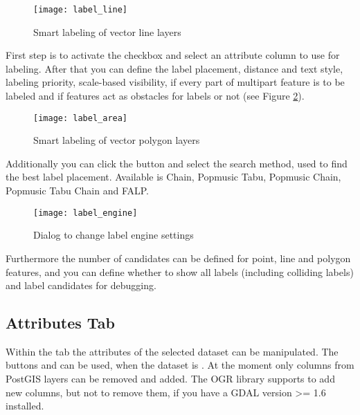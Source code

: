 \begin{figure}[ht]
\centering
   \texttt{[image: label\_line]}
   \caption{Smart labeling of vector line layers \nixcaption}\label{fig:linelabel}
\end{figure}


First step is to activate the  checkbox and select an attribute
column to use for labeling. After that you can define the label placement, distance and text
style, labeling priority, scale-based visibility, if every part of multipart feature is to be
labeled and if features act as obstacles for labels or not (see Figure \ref{fig:arealabel}).

\begin{figure}[ht]
\centering
   \texttt{[image: label\_area]}
   \caption{Smart labeling of vector polygon layers \nixcaption}\label{fig:arealabel}
\end{figure}


Additionally you can click the  button and select the search method,
used to find the best label placement. Available is Chain, Popmusic Tabu, Popmusic Chain,
Popmusic Tabu Chain and FALP.

\begin{figure}[ht]
\centering
   \texttt{[image: label\_engine]}
   \caption{Dialog to change label engine settings \nixcaption}\label{fig:labelengine}
\end{figure}

Furthermore the number of candidates can be defined for point, line and polygon features,
and you can define whether to show all labels (including colliding labels) and label
candidates for debugging.

\subsection{Attributes Tab}\label{label_attributes}

Within the  tab the attributes of the selected dataset can be
manipulated. The buttons  and
 can be
used, when the dataset is .
At the moment only columns from PostGIS layers can be removed and added. The
OGR library supports to add new columns, but not to remove them, if you have
a GDAL version >= 1.6 installed.

